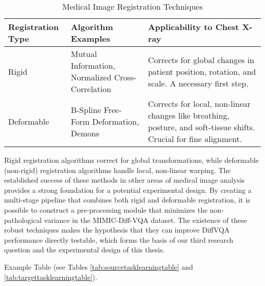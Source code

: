 \begin{table}[h!]
	\centering
	\caption{Medical Image Registration Techniques}
	\label{tab:registration_techniques}
	\begin{tabular}{|l|l|p{7cm}|}
		\hline
		\textbf{Registration Type} & \textbf{Algorithm Examples} & \textbf{Applicability to Chest X-ray} \\ \hline \hline
		Rigid & Mutual Information, Normalized Cross-Correlation & Corrects for global changes in patient position, rotation, and scale. A necessary first step. \\ \hline
		Deformable & B-Spline Free-Form Deformation, Demons & Corrects for local, non-linear changes like breathing, posture, and soft-tissue shifts. Crucial for fine alignment. \\ \hline
	\end{tabular}
\end{table}

Rigid registration algorithms correct for global transformations, while deformable (non-rigid) registration algorithms handle local, non-linear warping. The established success of these methods in other areas of medical image analysis provides a strong foundation for a potential experimental design. By creating a multi-stage pipeline that combines both rigid and deformable registration, it is possible to construct a pre-processing module that minimizes the non-pathological variance in the MIMIC-Diff-VQA dataset. The existence of these robust techniques makes the hypothesis that they can improve DiffVQA performance directly testable, which forms the basis of our third research question and the experimental design of this thesis.

Example Table (see Tables \ref{tab:sourcetasklearningtable} and \ref{tab:targettasklearningtable}).

